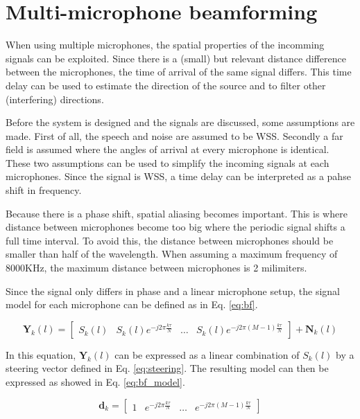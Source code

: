 \section{Multi-microphone beamforming} \label{sec:mm_bf}
When using multiple microphones, the spatial properties of the incomming signals can be exploited. Since there is a (small) but relevant  distance difference between the microphones, the time of arrival of the same signal differs. This time delay can be used to estimate the direction of the source and to filter other (interfering) directions.

Before the system is designed and the signals are discussed, some assumptions are made. First of all, the speech and noise are assumed to be  WSS. Secondly a far field is assumed where the angles of arrival at every microphone is identical. These two assumptions can be used to simplify the incoming signals at each microphones. Since the signal is WSS, a time delay can be interpreted as a pahse shift in frequency.

Because there is a phase shift, spatial aliasing becomes important. This is where distance between microphones become too big where the periodic signal shifts a full time interval. To avoid this, the distance between microphones should be smaller than half of the wavelength. When assuming a maximum frequency of 8000KHz, the maximum distance between microphones is 2 milimiters.

Since the signal only differs in phase and a linear microphone setup, the signal model for each microphone can be defined as in Eq. \ref{eq:bf}.

\begin{equation}
  \mathbf{Y}_{k}(l) =
  \begin{bmatrix}
    S_{k}(l) & S_{k}(l)e^{-j2\pi\frac{k\tau}{N}} & \hdots & S_{k}(l)e^{-j2\pi(M-1)\frac{k\tau}{N}}
  \end{bmatrix}
  + \mathbf{N}_{k}(l)
  \label{eq:bf}
\end{equation}

In this equation, $\mathbf{Y}_{k}(l)$ can be expressed as a linear combination of $S_{k}(l)$ by a steering vector defined in Eq. \ref{eq:steering}. The resulting model can then be expressed as showed in Eq. \ref{eq:bf_model}.

\begin{equation}
  \mathbf{d}_{k} =
  \begin{bmatrix}
    1 & e^{-j2\pi \frac{k\tau}{N}} & \hdots & e^{-j2\pi(M-1)\frac{k\tau}{N}}
  \end{bmatrix}
  \label{eq:steering}
\end{equation}

